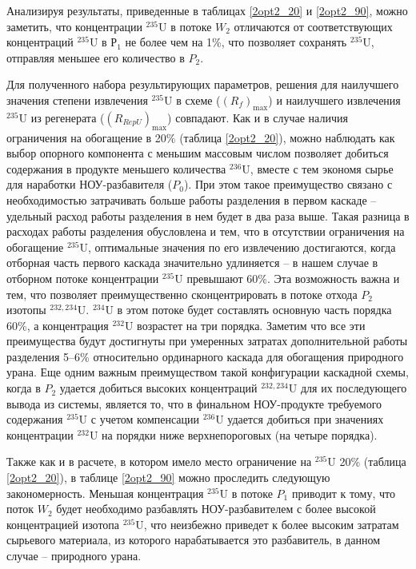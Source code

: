 Анализируя результаты, приведенные в таблицах \ref{2opt2_20} и \ref{2opt2_90}, можно заметить, что концентрации $^{235}$U в потоке $W_2$ отличаются от соответствующих концентраций $^{235}$U в $Р_1$ не более чем на 1\%, что позволяет сохранять $^{235}$U, отправляя меньшее его количество в $P_2$.

Для полученного набора результирующих параметров, решения для наилучшего значения степени извлечения $^{235}$U в схеме ($(R_{f})_\text{max}$) и наилучшего извлечения $^{235}$U из регенерата ($(R_{RepU})_\text{max}$) совпадают. Как и в случае наличия ограничения на обогащение в 20\% (таблица \ref{2opt2_20}), можно наблюдать как выбор опорного компонента с меньшим массовым числом позволяет добиться содержания в продукте меньшего количества $^{236}$U, вместе с тем экономя сырье для наработки НОУ-разбавителя ($P_{0}$). При этом такое преимущество связано с необходимостью затрачивать больше работы разделения в первом каскаде -- удельный расход работы разделения в нем будет в два раза выше. Такая разница в расходах работы разделения обусловлена и тем, что в отсутствии ограничения на обогащение $^{235}$U, оптимальные значения по его извлечению достигаются, когда отборная часть первого каскада значительно удлиняется -- в нашем случае в отборном потоке концентрации $^{235}$U превышают 60\%. Эта возможность важна и тем, что позволяет преимущественно сконцентрировать в потоке отхода $P_{2}$ изотопы $^{232,234}$U. $^{234}$U в этом потоке будет составлять основную часть порядка 60\%, а концентрация $^{232}$U возрастет на три порядка. Заметим что все эти преимущества будут достигнуты при умеренных затратах дополнительной работы разделения 5--6\% относительно ординарного каскада для обогащения природного урана. Еще одним важным преимуществом такой конфигурации каскадной схемы, когда в $P_{2}$ удается добиться высоких  концентраций $^{232,234}$U для их последующего вывода из системы, является то, что в финальном НОУ-продукте требуемого содержания $^{235}$U с учетом компенсации $^{236}$U удается добиться при значениях концентрации $^{232}$U на порядки ниже верхнепороговых (на четыре порядка).

Также как и в расчете, в котором имело место ограничение на $^{235}$U 20\% (таблица \ref{2opt2_20}), в таблице \ref{2opt2_90} можно проследить следующую закономерность. Меньшая концентрация $^{235}$U в потоке $P_{1}$ приводит к тому, что поток $W_{2}$ будет необходимо разбавлять НОУ-разбавителем с более высокой концентрацией изотопа $^{235}$U, что неизбежно приведет к более высоким затратам сырьевого материала, из которого нарабатывается это разбавитель, в данном случае -- природного урана.

